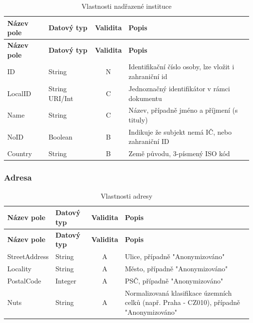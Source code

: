 \begin{center}
\begin{longtable}{lp{20mm}cp{65mm}}
\label{grid_mlmmh} \\
\multicolumn{1}{l}{\textbf{Název pole}} & 
\multicolumn{1}{l}{\textbf{Datový typ}} & 
\multicolumn{1}{l}{\textbf{Validita}} & 
\multicolumn{1}{l}{\textbf{Popis}} \\ \hline 
\endfirsthead
\multicolumn{1}{l}{\textbf{Název pole}} & 
\multicolumn{1}{l}{\textbf{Datový typ}} & 
\multicolumn{1}{l}{\textbf{Validita}} & 
\multicolumn{1}{l}{\textbf{Popis}} \\ \hline 
\hline
\endhead
\endfoot
\caption{Vlastnosti nadřazené instituce}
\endlastfoot
ID & String & N & Identifikační číslo osoby, lze vložit i zahraniční id \\
\rowcolor{validateC}LocalID & String URI/Int & C & Jednoznačný identifikátor v rámci dokumentu \\
\rowcolor{validateC}Name & String & C & Název, případně jméno a příjmení (s tituly) \\
\rowcolor{validateB}NoID & Boolean & B & Indikuje že subjekt nemá IČ, nebo zahraniční ID \\
\rowcolor{validateB}Country & String & B & Země původu, 3-písmený ISO kód \\
\end{longtable}
\end{center}

\newpage

\subsubsection*{Adresa}

\begin{center}
\begin{longtable}{lp{20mm}cp{65mm}}
\label{grid_mlmmh} \\
\multicolumn{1}{l}{\textbf{Název pole}} & 
\multicolumn{1}{l}{\textbf{Datový typ}} & 
\multicolumn{1}{l}{\textbf{Validita}} & 
\multicolumn{1}{l}{\textbf{Popis}} \\ \hline 
\endfirsthead
\multicolumn{1}{l}{\textbf{Název pole}} & 
\multicolumn{1}{l}{\textbf{Datový typ}} & 
\multicolumn{1}{l}{\textbf{Validita}} & 
\multicolumn{1}{l}{\textbf{Popis}} \\ \hline 
\hline
\endhead
\endfoot
\caption{Vlastnosti adresy}
\endlastfoot
\rowcolor{validateA}StreetAddress & String & A & Ulice, případně "Anonymizováno" \\
\rowcolor{validateA}Locality & String & A & Město, případně "Anonymizováno" \\
\rowcolor{validateA}PostalCode & Integer & A & PSČ, případně "Anonymizováno" \\
\rowcolor{validateA}Nuts & String & A & Normalizovaná klasifikace územních celků (např. Praha - CZ010), případně "Anonymizováno" \\
\end{longtable}
\end{center}

